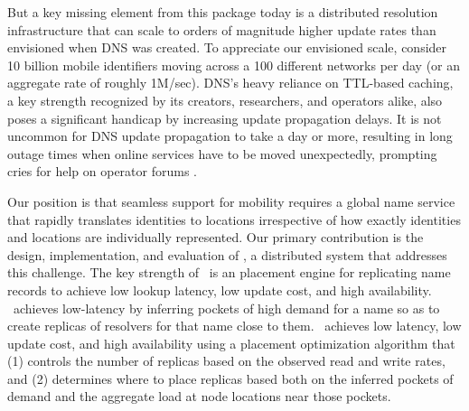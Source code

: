 But a key missing element from this package today is a distributed resolution infrastructure that can scale to orders of magnitude higher update rates than envisioned when DNS was created. To appreciate our envisioned scale, consider 10 billion mobile identifiers moving across a 100 different networks per day (or an aggregate rate of roughly 1M/sec). DNS's heavy reliance on TTL-based caching, a key strength recognized by its creators, researchers, and operators alike, also poses a significant handicap by increasing update propagation delays. It is not uncommon for DNS update propagation to take a day or more, resulting in long  outage times when online services have to be moved unexpectedly, prompting cries for help on operator forums \cite{serverfault}.





Our position is that seamless support for mobility requires a global name service that rapidly translates identities to locations irrespective of how exactly identities and locations are individually represented. %
Our primary contribution is the design, implementation, and evaluation of \auspice, a distributed system that addresses this challenge. The key strength of \auspice\ is an placement engine  for replicating name records to achieve low lookup latency, low update cost, and high availability.  \auspice\ achieves low-latency by inferring pockets of high demand for a name so as to create replicas of resolvers for that name close to them. \auspice\ achieves low latency,  low update cost,  and high availability using a placement optimization algorithm that (1) controls the number of replicas based on the observed read and write rates, and (2) determines where to place replicas based both on the inferred pockets of demand and the aggregate load at node locations near those pockets. 



